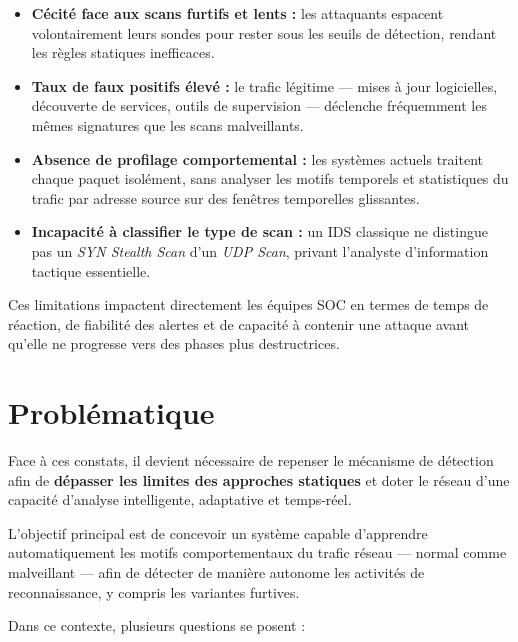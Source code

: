 \documentclass[12pt,a4paper]{article}
\begin{document}
\begin{itemize}[nosep,leftmargin=1.5em]
  \item \textbf{C\'{e}cit\'{e} face aux scans furtifs et lents :}
        les attaquants espacent volontairement leurs sondes pour rester sous les seuils
        de d\'{e}tection, rendant les r\`{e}gles statiques inefficaces.
  \item \textbf{Taux de faux positifs \'{e}lev\'{e} :}
        le trafic l\'{e}gitime --- mises \`{a} jour logicielles, d\'{e}couverte de services,
        outils de supervision --- d\'{e}clenche fr\'{e}quemment les m\^{e}mes signatures
        que les scans malveillants.
  \item \textbf{Absence de profilage comportemental :}
        les syst\`{e}mes actuels traitent chaque paquet isol\'{e}ment, sans analyser
        les motifs temporels et statistiques du trafic par adresse source sur des
        fen\^{e}tres temporelles glissantes.
  \item \textbf{Incapacit\'{e} \`{a} classifier le type de scan :}
        un IDS classique ne distingue pas un \textit{SYN Stealth Scan} d'un
        \textit{UDP Scan}, privant l'analyste d'information tactique essentielle.
\end{itemize}

Ces limitations impactent directement les \'{e}quipes SOC en termes de temps de r\'{e}action,
de fiabilit\'{e} des alertes et de capacit\'{e} \`{a} contenir une attaque avant qu'elle
ne progresse vers des phases plus destructrices.

\section{Probl\'{e}matique}

Face \`{a} ces constats, il devient n\'{e}cessaire de repenser le m\'{e}canisme de d\'{e}tection
afin de \textbf{d\'{e}passer les limites des approches statiques} et doter le r\'{e}seau
d'une capacit\'{e} d'analyse intelligente, adaptative et temps-r\'{e}el.

L'objectif principal est de concevoir un syst\`{e}me capable d'apprendre automatiquement
les motifs comportementaux du trafic r\'{e}seau --- normal comme malveillant --- afin de
d\'{e}tecter de mani\`{e}re autonome les activit\'{e}s de reconnaissance, y compris
les variantes furtives.

Dans ce contexte, plusieurs questions se posent :
\end{document}
